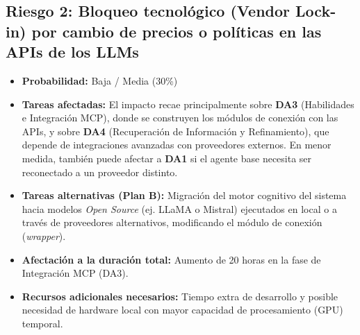 \documentclass[11pt, letterpaper]{article}
\begin{document}
\subsection{Riesgo 2: Bloqueo tecnológico (Vendor Lock-in) por cambio de precios o políticas en las APIs de los LLMs}
\begin{itemize}
    \item \textbf{Probabilidad:} Baja / Media (30\%) \cite{opara_vendor_lockin_2016}
    \item \textbf{Tareas afectadas:} El impacto recae principalmente sobre \textbf{DA3} (Habilidades e Integración MCP), donde se construyen los módulos de conexión con las APIs, y sobre \textbf{DA4} (Recuperación de Información y Refinamiento), que depende de integraciones avanzadas con proveedores externos. En menor medida, también puede afectar a \textbf{DA1} si el agente base necesita ser reconectado a un proveedor distinto.
    \item \textbf{Tareas alternativas (Plan B):} Migración del motor cognitivo del sistema hacia modelos \textit{Open Source} (ej. LLaMA o Mistral) ejecutados en local o a través de proveedores alternativos, modificando el módulo de conexión (\textit{wrapper}).
    \item \textbf{Afectación a la duración total:} Aumento de 20 horas en la fase de Integración MCP (DA3).
    \item \textbf{Recursos adicionales necesarios:} Tiempo extra de desarrollo y posible necesidad de hardware local con mayor capacidad de procesamiento (GPU) temporal.
\end{itemize}
\end{document}
